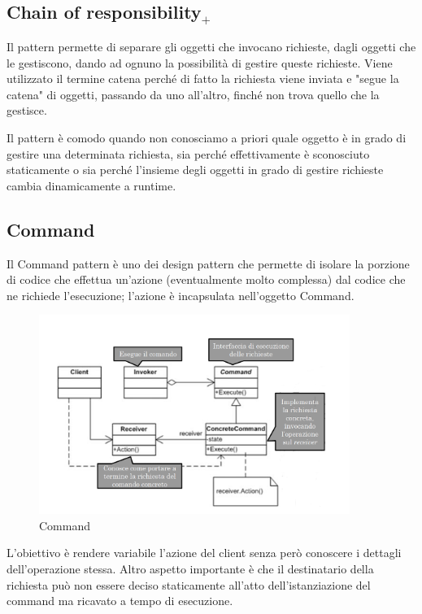 \subsection{Chain of responsibility$_+$}
Il pattern permette di separare gli oggetti che invocano richieste, dagli oggetti che le gestiscono, dando ad ognuno la possibilità di gestire queste richieste. Viene utilizzato il termine catena perché di fatto la richiesta viene inviata e "segue la catena" di oggetti, passando da uno all'altro, finché non trova quello che la gestisce.

Il pattern è comodo quando non conosciamo a priori quale oggetto è in grado di gestire una determinata richiesta, sia perché effettivamente è sconosciuto staticamente o sia perché l'insieme degli oggetti in grado di gestire richieste cambia dinamicamente a runtime.

\subsection{Command}
Il Command pattern è uno dei design pattern che permette di isolare la porzione di codice che effettua un'azione (eventualmente molto complessa) dal codice che ne richiede l'esecuzione; l'azione è incapsulata nell'oggetto Command.

\begin{figure}[H]
\includegraphics[width=0.9\textwidth]{res/img/DP/command}
\caption{Command}
\end{figure}

L'obiettivo è rendere variabile l'azione del client senza però conoscere i dettagli dell'operazione stessa. 
Altro aspetto importante è che il destinatario della richiesta può non essere deciso staticamente all'atto dell'istanziazione del command ma ricavato a tempo di esecuzione.

